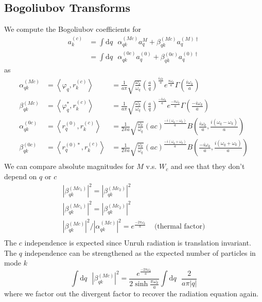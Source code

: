 \documentclass[12pt,a4paper]{article}
\newcommand{\dv}[1]{\mathrm{d} #1 \text{ }}
\begin{document}
\subsection{Bogoliubov Transforms}

We compute the Bogoliubov coefficients for
\begin{equation}
  \begin{array}{ll}
  a^{(c)}_k &= \int \dv{q} \alpha^{(Mc)}_{qk} a^{M}_q + \beta^{(Mc)}_{qk} a^{(M)\dagger}_q \\
  &= \int \dv{q} \alpha^{(0c)}_{qk} a^{(0)}_q + \beta^{(0c)}_{qk} a^{(0)\dagger}_q
  \end{array}
\end{equation}
as
\begin{equation}
  \begin{array}{ccl}
    \alpha^{(Mc)}_{qk} &= \left<\varphi_q, r_k^{(c)} \right> &= \frac{1}{a \pi} \sqrt{\frac{\omega_k}{\omega_q}} \left(\frac{a}{q}\right)^{\frac{i\omega_k}{a}} e^{\frac{\pi \omega_k}{a}} \Gamma\left(\frac{i\omega_k}{a}\right) \\
    \beta^{(Mc)}_{qk} &= \left<\varphi_q^*, r_k^{(c)} \right> &= \frac{1}{a \pi} \sqrt{\frac{\omega_k}{\omega_q}} \left(\frac{a}{q}\right)^{\frac{-i\omega_k}{a}} e^{\frac{-\pi \omega_k}{a}} \Gamma\left(\frac{-i\omega_k}{a}\right) \\
    \alpha^{(0c)}_{qk} &= \left<r_q^{(0)}, r_k^{(c)} \right> &= \frac{1}{2 \pi a}\sqrt{\frac{\omega_k}{\omega_q}} (ac)^{\frac{-i(\omega_q - \omega_k)}{a}} B\left(\frac{i\omega_k}{a}, \frac{i(\omega_q - \omega_k)}{a}\right) \\
    \beta^{(0c)}_{qk} &= \left<r_q^{(0)*}, r_k^{(c)} \right> &= \frac{1}{2 \pi a}\sqrt{\frac{\omega_k}{\omega_q}} (ac)^{\frac{-i(\omega_q + \omega_k)}{a}} B\left(\frac{-i\omega_k}{a}, \frac{i(\omega_q + \omega_k)}{a}\right) \\

  \end{array}
\end{equation}
We can compare absolute magnitudes for $M$ v.s. $W_c$ and see that they don't depend on $q$ or $c$
\begin{equation}
  \begin{array}{cc}
    \left|\beta_{qk}^{(Mc_1)}\right|^2 = \left|\beta_{qk}^{(Mc_2)}\right|^2 & \\
    \left|\beta_{qk}^{(Mc_1)}\right|^2 = \left|\beta_{qk}^{(Mc_2)}\right|^2 & \\
    \left|\beta_{qk}^{(Mc)}\right|^2 / \left|\alpha_{qk}^{(Mc)}\right|^2 = e^{\frac{-2\pi\omega_k}{a}}  & \text{   (thermal factor)} \\
 \end{array}
\end{equation}
The $c$ independence is expected since Unruh radiation is translation invariant. The $q$ independence can be strengthened as the expected number of particles in mode $k$
\begin{equation}
 \int \dv{q} \left|\beta_{qk}^{(Mc)}\right|^2 = \frac{e^{\frac{-2 \pi \omega_k}{a}}}{2 \sinh \frac{\pi \omega_k}{a}} \int \dv{q} \frac{2}{a\pi |q|}
\end{equation}
where we factor out the divergent factor to recover the radiation equation again.
\end{document}
